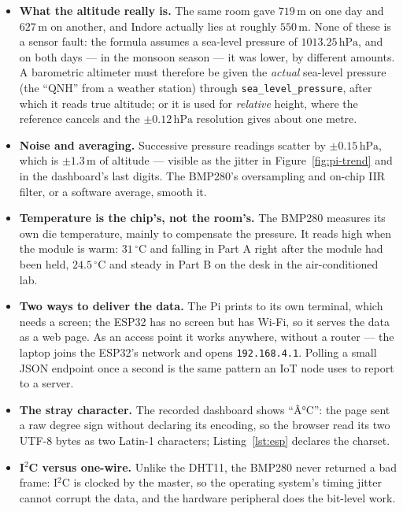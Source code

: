 \documentclass[10pt,a4paper]{article}
\begin{document}
\begin{itemize}
  \item \textbf{What the altitude really is.} The same room gave $719\,\mathrm{m}$ on one
        day and $627\,\mathrm{m}$ on another, and Indore actually lies at roughly
        $550\,\mathrm{m}$. None of these is a sensor fault: the formula assumes a
        sea-level pressure of $1013.25\,\mathrm{hPa}$, and on both days --- in the monsoon
        season --- it was lower, by different amounts. A barometric altimeter must
        therefore be given the \emph{actual} sea-level pressure (the ``QNH'' from a weather
        station) through \texttt{sea\_level\_pressure}, after which it reads true altitude;
        or it is used for \emph{relative} height, where the reference cancels and the
        $\pm0.12\,\mathrm{hPa}$ resolution gives about one metre.
  \item \textbf{Noise and averaging.} Successive pressure readings scatter by
        $\pm0.15\,\mathrm{hPa}$, which is $\pm1.3\,\mathrm{m}$ of altitude --- visible as the
        jitter in Figure~\ref{fig:pi-trend} and in the dashboard's last digits. The
        BMP280's oversampling and on-chip IIR filter, or a software average, smooth it.
  \item \textbf{Temperature is the chip's, not the room's.} The BMP280 measures its own
        die temperature, mainly to compensate the pressure. It reads high when the module
        is warm: $31\,^{\circ}\mathrm{C}$ and falling in Part A right after the module had
        been held, $24.5\,^{\circ}\mathrm{C}$ and steady in Part B on the desk in the
        air-conditioned lab.
  \item \textbf{Two ways to deliver the data.} The Pi prints to its own terminal, which
        needs a screen; the ESP32 has no screen but has Wi-Fi, so it serves the data as
        a web page. As an access point it works anywhere, without a router --- the laptop
        joins the ESP32's network and opens \texttt{192.168.4.1}. Polling a small JSON
        endpoint once a second is the same pattern an IoT node uses to report to a server.
  \item \textbf{The stray character.} The recorded dashboard shows ``\^{A}°C'': the page
        sent a raw degree sign without declaring its encoding, so the browser read its two
        UTF-8 bytes as two Latin-1 characters; Listing~\ref{lst:esp} declares the charset.
  \item \textbf{I$^2$C versus one-wire.} Unlike the DHT11, the BMP280 never returned a
        bad frame: I$^2$C is clocked by the master, so the operating system's timing
        jitter cannot corrupt the data, and the hardware peripheral does the bit-level work.
\end{itemize}
\end{document}
